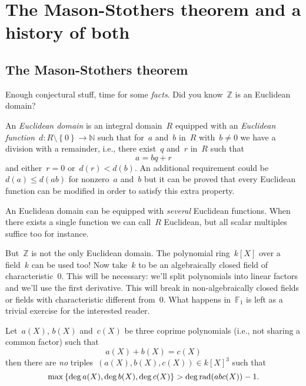 \section{The Mason-Stothers theorem and a history of both}
\label{section:mason-stothers}

\subsection{The Mason-Stothers theorem}

Enough conjectural stuff, time for some \emph{facts}. Did you know~$\mathbb{Z}$ is an Euclidean domain?

\begin{definition}
  An \emph{Euclidean domain} is an integral domain~$R$ equipped with an \emph{Euclidean function}~$d\colon R\setminus\left\{ 0 \right\}\to\mathbb{N}$ such that for~$a$ and~$b$ in~$R$ with~$b\neq 0$ we have a division with a remainder, i.e., there exist~$q$ and~$r$ in~$R$ such that
  \begin{equation}
    a=bq+r
  \end{equation}
  and either~$r=0$ or~$d(r)<d(b)$. An additional requirement could be~$d(a)\leq d(ab)$ for nonzero~$a$ and~$b$ but it can be proved that every Euclidean function can be modified in order to satisfy this extra property.
\end{definition}

\begin{remark}
  An Euclidean domain can be equipped with \emph{several} Euclidean functions. When there exists a single function we can call~$R$ Euclidean, but all scalar multiples suffice too for instance.
\end{remark}

But~$\mathbb{Z}$ is not the only Euclidean domain. The polynomial ring~$k[X]$ over a field~$k$ can be used too! Now take~$k$ to be an algebraically closed field of characteristic~$0$. This will be necessary: we'll split polynomials into linear factors and we'll use the first derivative. This will break in non-algebraically closed fields or fields with characteristic different from~$0$. What happens in~$\mathbb{F}_1$ is left as a trivial exercise for the interested reader.

\begin{theorem}
  \label{theorem:mason-stothers}
  Let~$a(X)$, $b(X)$ and~$c(X)$ be three coprime polynomials (i.e., not sharing a common factor) such that
  \begin{equation}
    \label{equation:mason-stothers-equality}
    a(X)+b(X)=c(X)
  \end{equation}
  then there are \emph{no} triples~$(a(X),b(X),c(X))\in k[X]^3$ such that
  \begin{equation}
    \max\left\{ \deg a(X),\deg b(X),\deg c(X) \right\}>\deg\operatorname{rad}(abc(X))-1.
  \end{equation}
\end{theorem}

